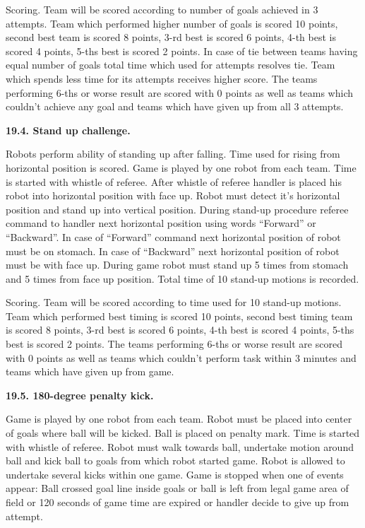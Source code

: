 \documentclass[a4paper]{article}
\begin{document}
Scoring. Team will be scored according to number of goals achieved in 3 attempts. Team which performed higher number of
goals is scored 10 points, second best team is scored 8 points, 3-rd best is scored 6 points, 4-th best is scored 4
points, 5-ths best is scored 2 points. In case of tie between teams having equal number of goals total time which used
for attempts resolves tie. Team which spends less time for its attempts receives higher score. The teams performing
6-ths or worse result are scored with 0 points as well as teams which couldn’t achieve any goal and teams
which have given up from all 3 attempts.

\bigskip

\textbf{19.4. Stand up challenge.}

Robots perform ability of standing up after falling. Time used for rising from horizontal position is scored. Game is
played by one robot from each team. Time is started with whistle of referee. After whistle of referee handler is placed
his robot into horizontal position with face up. Robot must detect it’s horizontal position and stand up
into vertical position. During stand-up procedure referee command to handler next horizontal position using words
“Forward” or “Backward”. In case of “Forward” command next horizontal position of robot must be on stomach. In case of
“Backward” next horizontal position of robot must be with face up. During game robot must stand up 5 times from stomach
and 5 times from face up position. Total time of 10 stand-up motions is recorded. 

Scoring. Team will be scored according to time used for 10 stand-up motions. Team which performed best timing is scored
10 points, second best timing team is scored 8 points, 3-rd best is scored 6 points, 4-th best is scored 4 points,
5-ths best is scored 2 points. The teams performing 6-ths or worse result are scored with 0 points as well as teams
which couldn't perform task within 3 minutes and teams which have given up from game. \ 

\bigskip

\textbf{19.5. 180-degree penalty kick.}

Game is played by one robot from each team. Robot must be placed into center of goals where ball will be kicked. Ball is
placed on penalty mark. Time is started with whistle of referee. Robot must walk towards ball, undertake motion around
ball and kick ball to goals from which robot started game. Robot is allowed to undertake several kicks within one game.
Game is stopped when one of events appear: Ball crossed goal line inside goals or ball is left from legal game area of
field or 120 seconds of game time are expired or handler decide to give up from attempt.
\end{document}
